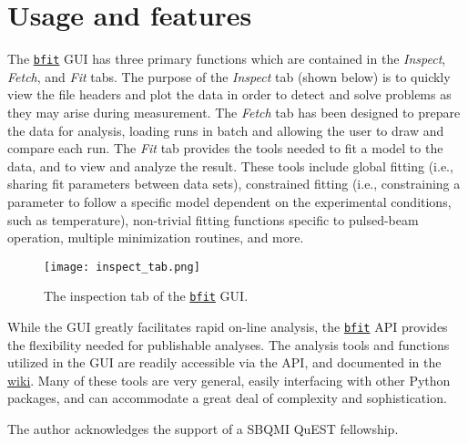 \documentclass[aps, prb, twocolumn, reprint, superscriptaddress, floatfix, citeautoscript, longbibliography]{revtex4-1}
\begin{document}
\section{Usage and features}

The \href{https://github.com/dfujim/bfit}{\texttt{bfit}} GUI has three primary functions which are contained in the \textit{Inspect}, \textit{Fetch}, and \textit{Fit} tabs. The purpose of the \textit{Inspect} tab (shown below) is to quickly view the file headers and plot the data in order to detect and solve problems as they may arise during measurement. The \textit{Fetch} tab has been designed to prepare the data for analysis, loading runs in batch and allowing the user to draw and compare each run. The \textit{Fit} tab provides the tools needed to fit a model to the data, and to view and analyze the result. These tools include global fitting (i.e., sharing fit parameters between data sets), constrained fitting (i.e., constraining a parameter to follow a specific model dependent on the experimental conditions, such as temperature), non-trivial fitting functions specific to pulsed-beam operation, multiple minimization routines, and more.

\begin{figure}
    \centering
    \texttt{[image: inspect\_tab.png]}
    \caption{The inspection tab of the \href{https://github.com/dfujim/bfit}{\texttt{bfit}} GUI.}
    \label{}
\end{figure}

While the GUI greatly facilitates rapid on-line analysis, the \href{https://github.com/dfujim/bfit}{\texttt{bfit}} API provides the flexibility needed for publishable analyses. The analysis tools and functions utilized in the GUI are readily accessible via the API, and documented in the \href{https://github.com/dfujim/bfit/wiki}{wiki}. Many of these tools are very general, easily interfacing with other Python packages, and can accommodate a great deal of complexity and sophistication.

\begin{acknowledgments}
The author acknowledges the support of a SBQMI QuEST fellowship.
\end{acknowledgments}



\end{document}
